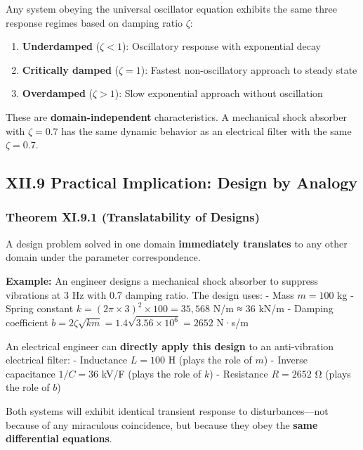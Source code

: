 \documentclass[
]{article}
\providecommand{\tightlist}{%
  \setlength{\itemsep}{0pt}\setlength{\parskip}{0pt}}
\begin{document}
Any system obeying the universal oscillator equation exhibits the same
three response regimes based on damping ratio \(\zeta\):

\begin{enumerate}
\def\labelenumi{\arabic{enumi}.}
\tightlist
\item
  \textbf{Underdamped} (\(\zeta < 1\)): Oscillatory response with
  exponential decay
\item
  \textbf{Critically damped} (\(\zeta = 1\)): Fastest non-oscillatory
  approach to steady state
\item
  \textbf{Overdamped} (\(\zeta > 1\)): Slow exponential approach without
  oscillation
\end{enumerate}

These are \textbf{domain-independent} characteristics. A mechanical
shock absorber with \(\zeta = 0.7\) has the same dynamic behavior as an
electrical filter with the same \(\zeta = 0.7\).

\subsection{XII.9 Practical Implication: Design by
Analogy}\label{xii.9-practical-implication-design-by-analogy}

\subsubsection{Theorem XI.9.1 (Translatability of
Designs)}\label{theorem-xi.9.1-translatability-of-designs}

A design problem solved in one domain \textbf{immediately translates} to
any other domain under the parameter correspondence.

\textbf{Example:} An engineer designs a mechanical shock absorber to
suppress vibrations at 3 Hz with 0.7 damping ratio. The design uses: -
Mass \(m = 100\) kg - Spring constant
\(k = (2\pi \times 3)^2 \times 100 = 35,568\) N/m ≈ 36 kN/m - Damping
coefficient \(b = 2\zeta\sqrt{km} = 1.4\sqrt{3.56 \times 10^6} = 2652\)
N·s/m

An electrical engineer can \textbf{directly apply this design} to an
anti-vibration electrical filter: - Inductance \(L = 100\) H (plays the
role of \(m\)) - Inverse capacitance \(1/C = 36\) kV/F (plays the role
of \(k\)) - Resistance \(R = 2652\) Ω (plays the role of \(b\))

Both systems will exhibit identical transient response to
disturbances---not because of any miraculous coincidence, but because
they obey the \textbf{same differential equations}.
\end{document}
